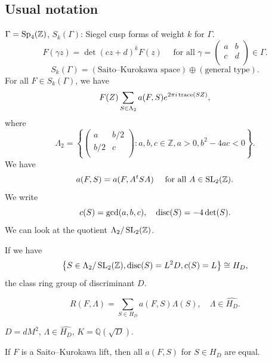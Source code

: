 \documentclass[reqno]{amsart} 
\begin{document}
\subsection{Usual notation}\label{sec:cnfhlpusxd}
$\Gamma = \operatorname{Sp}_4(\mathbb{Z})$, $S_k(\Gamma)$: Siegel cusp forms of weight $k$ for $\Gamma$.
\begin{equation*}
  F(\gamma z) = \det(c z + d)^k F(z) \quad \text{ for all } \gamma =
  \begin{pmatrix}
    a    & b \\
    c & d \\
  \end{pmatrix} \in \Gamma.
\end{equation*}
\begin{equation*}
  S_k(\Gamma) =(\text{Saito--Kurokawa space}) \oplus(\text{general type}).
\end{equation*}
For all $F \in S_k(\Gamma)$, we have
\begin{equation*}
  F(Z) \sum_{S \in \Lambda_2} a(F, S) e^{2 \pi i \operatorname{trace}(S Z)},
\end{equation*}
where
\begin{equation*}
  \Lambda_2 = \left\{
    \begin{pmatrix}
      a      & b/2 \\
      b/2 & c \\
    \end{pmatrix} : a, b, c \in \mathbb{Z}, a > 0, b^2 - 4 a c < 0 \right\}.
\end{equation*}
We have
\begin{equation*}
  a(F, S) = a(F, A^t S A) \quad \text{ for all } A \in \operatorname{SL}_2(\mathbb{Z}).
\end{equation*}
We write
\begin{equation*}
  c(S) = \gcd(a,b,c),
  \quad \operatorname{disc}(S) = - 4 \det(S).
\end{equation*}
We can look at the quotient $\Lambda_2 / \operatorname{SL}_2(\mathbb{Z})$.

If we have
\begin{equation*}
  \left\{ S \in \Lambda_2 / \operatorname{SL}_2(\mathbb{Z}), \operatorname{disc}(S) = L^2 D, c(S) = L \right\} \cong H_D,
\end{equation*}
the class ring group of discriminant $D$.

\begin{equation*}
  R(F, \Lambda ) = \sum_{S \in H_D } a(F, S) \Lambda(S), \quad
  \Lambda \in \widehat{H_D}.
\end{equation*}
\begin{remark}\label{remark:cnfg5j8o2u}
  $D = d M^2$, $\Lambda \in \widehat{H_D}$, $K = \mathbb{Q}(\sqrt{D})$.
\end{remark}
\begin{remark}\label{remark:cnfg5j8p19}
  If $F$ is a Saito--Kurokawa lift, then all $a(F, S)$ for $S \in H_D$ are equal.
\end{remark}
\end{document}
